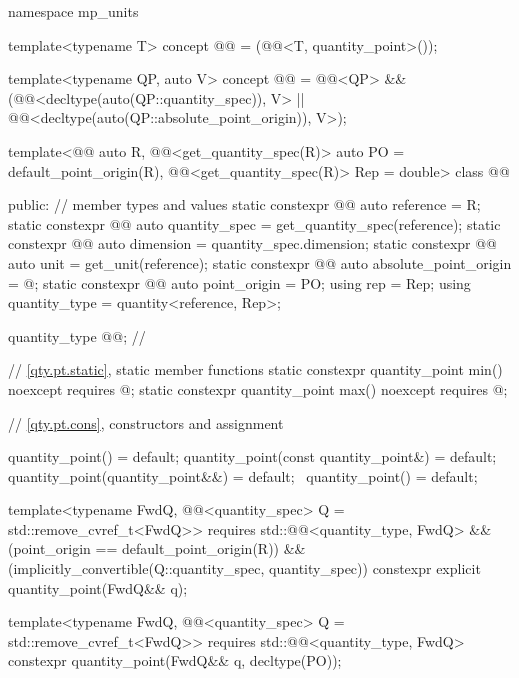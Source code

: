 \begin{codeblock}
namespace mp_units {

template<typename T>
concept @@ = (@@<T, quantity_point>());

template<typename QP, auto V>
concept @@ =
  @@<QP> && (@@<decltype(auto(QP::quantity_spec)), V> ||
                        @@<decltype(auto(QP::absolute_point_origin)), V>);

template<@@ auto R,
         @@<get_quantity_spec(R)> auto PO = default_point_origin(R),
         @@<get_quantity_spec(R)> Rep = double>
class @@ {
public:
  // member types and values
  static constexpr @@ auto reference = R;
  static constexpr @@ auto quantity_spec = get_quantity_spec(reference);
  static constexpr @@ auto dimension = quantity_spec.dimension;
  static constexpr @@ auto unit = get_unit(reference);
  static constexpr @@ auto absolute_point_origin = @\seebelownc@;
  static constexpr @@ auto point_origin = PO;
  using rep = Rep;
  using quantity_type = quantity<reference, Rep>;

  quantity_type @@;  // \expos

  // \ref{qty.pt.static}, static member functions
  static constexpr quantity_point min() noexcept
    requires @\seebelownc@;
  static constexpr quantity_point max() noexcept
    requires @\seebelownc@;

  // \ref{qty.pt.cons}, constructors and assignment

  quantity_point() = default;
  quantity_point(const quantity_point&) = default;
  quantity_point(quantity_point&&) = default;
  ~quantity_point() = default;

  template<typename FwdQ, @@<quantity_spec> Q = std::remove_cvref_t<FwdQ>>
    requires std::@@<quantity_type, FwdQ> &&
             (point_origin == default_point_origin(R)) &&
             (implicitly_convertible(Q::quantity_spec, quantity_spec))
  constexpr explicit quantity_point(FwdQ&& q);

  template<typename FwdQ, @@<quantity_spec> Q = std::remove_cvref_t<FwdQ>>
    requires std::@@<quantity_type, FwdQ>
  constexpr quantity_point(FwdQ&& q, decltype(PO));

}}
\end{codeblock}
